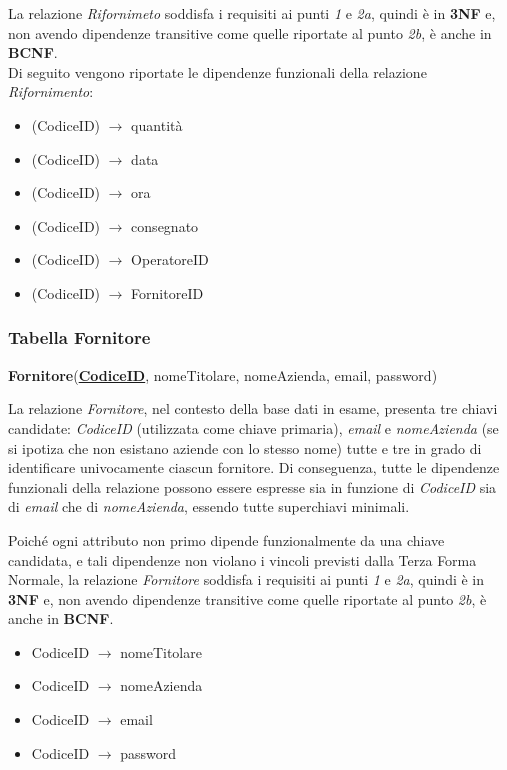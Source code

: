 \documentclass[12pt,a4paper]{article}
\begin{document}
    \noindent
    La relazione \textit{Rifornimeto} soddisfa i requisiti ai punti \textit{1} e \textit{2a}, quindi è in \textbf{3NF} e, non avendo dipendenze transitive come quelle riportate al punto \textit{2b}, è anche in \textbf{BCNF}.\\
    Di seguito vengono riportate le dipendenze funzionali della relazione \textit{Rifornimento}:
    \begin{itemize}[leftmargin=1em, label=$\circ$]
        \item (CodiceID) $\rightarrow$ quantità
        \item (CodiceID) $\rightarrow$ data
        \item (CodiceID) $\rightarrow$ ora
        \item (CodiceID) $\rightarrow$ consegnato
        \item (CodiceID) $\rightarrow$ OperatoreID
        \item (CodiceID) $\rightarrow$ FornitoreID
    \end{itemize}


    \subsubsection*{Tabella Fornitore}
    \begin{tcolorbox}[
        colback=gray!8,
        colframe=black!30,
        title=
    ]
        \textbf{Fornitore}(\textbf{\uline{CodiceID}}, nomeTitolare, nomeAzienda, email, password) 
    \end{tcolorbox}
    
    \noindent
    La relazione \textit{Fornitore}, nel contesto della base dati in esame, presenta tre chiavi candidate: \textit{CodiceID} (utilizzata come chiave primaria), \textit{email} e \textit{nomeAzienda} (se si ipotiza che non esistano aziende con lo stesso nome) tutte e tre in grado di identificare univocamente ciascun fornitore. Di conseguenza, tutte le dipendenze funzionali della relazione possono essere espresse sia in funzione di \textit{CodiceID} sia di \textit{email} che di \textit{nomeAzienda}, essendo tutte superchiavi minimali.

    \vspace{8pt}
    \noindent
    Poiché ogni attributo non primo dipende funzionalmente da una chiave candidata, e tali dipendenze non violano i vincoli previsti dalla Terza Forma Normale, la relazione \textit{Fornitore} soddisfa i requisiti ai punti \textit{1} e \textit{2a}, quindi è in \textbf{3NF} e, non avendo dipendenze transitive come quelle riportate al punto \textit{2b}, è anche in \textbf{BCNF}.
    \begin{itemize}[leftmargin=1em, label=$\circ$]
        \item CodiceID $\rightarrow$ nomeTitolare
        \item CodiceID $\rightarrow$ nomeAzienda
        \item CodiceID $\rightarrow$ email
        \item CodiceID $\rightarrow$ password
    \end{itemize}
    
\end{document}

